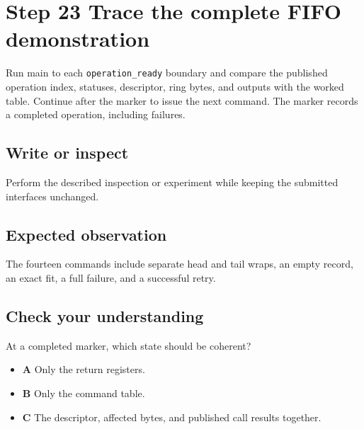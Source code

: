 \section{Step 23 Trace the complete FIFO demonstration}\label{ring-s23}

Run main to each \texttt{operation\_ready} boundary and compare the published operation index, statuses, descriptor, ring bytes, and outputs with the worked table. Continue after the marker to issue the next command. The marker records a completed operation, including failures.

\subsection{Write or inspect}
Perform the described inspection or experiment while keeping the submitted interfaces unchanged.

\subsection{Expected observation}
The fourteen commands include separate head and tail wraps, an empty record, an exact fit, a full failure, and a successful retry.

\subsection{Check your understanding}
At a completed marker, which state should be coherent?

\begin{itemize}
  \item \textbf{A} Only the return registers.
  \item \textbf{B} Only the command table.
  \item \textbf{C} The descriptor, affected bytes, and published call results together.
\end{itemize}
